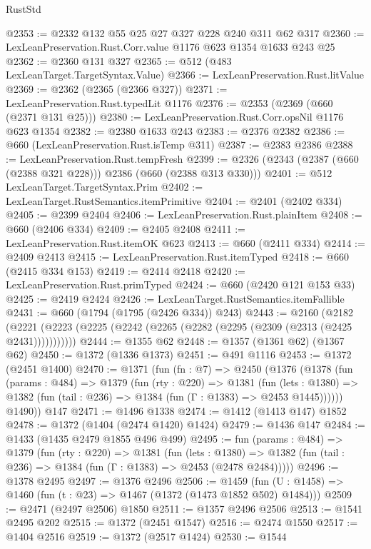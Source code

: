 \begin{lexlean}{RustStd}
\begin{coremodule}
@2353 := @2332 @132 @55 @25 @27 @327 @228 @240 @311 @62 @317
@2360 := LexLeanPreservation.Rust.Corr.value @1176 @623 @1354 @1633 @243 @25
@2362 := @2360 @131 @327
@2365 := @512 (@483 LexLeanTarget.TargetSyntax.Value)
@2366 := LexLeanPreservation.Rust.litValue
@2369 := @2362 (@2365 (@2366 @327))
@2371 := LexLeanPreservation.Rust.typedLit @1176
@2376 := @2353 (@2369 (@660 (@2371 @131 @25)))
@2380 := LexLeanPreservation.Rust.Corr.opsNil @1176 @623 @1354
@2382 := @2380 @1633 @243
@2383 := @2376 @2382
@2386 := @660 (LexLeanPreservation.Rust.isTemp @311)
@2387 := @2383 @2386
@2388 := LexLeanPreservation.Rust.tempFresh
@2399 := @2326 (@2343 (@2387 (@660 (@2388 @321 @228))) @2386 (@660 (@2388 @313 @330)))
@2401 := @512 LexLeanTarget.TargetSyntax.Prim
@2402 := LexLeanTarget.RustSemantics.itemPrimitive
@2404 := @2401 (@2402 @334)
@2405 := @2399 @2404
@2406 := LexLeanPreservation.Rust.plainItem
@2408 := @660 (@2406 @334)
@2409 := @2405 @2408
@2411 := LexLeanPreservation.Rust.itemOK @623
@2413 := @660 (@2411 @334)
@2414 := @2409 @2413
@2415 := LexLeanPreservation.Rust.itemTyped
@2418 := @660 (@2415 @334 @153)
@2419 := @2414 @2418
@2420 := LexLeanPreservation.Rust.primTyped
@2424 := @660 (@2420 @121 @153 @33)
@2425 := @2419 @2424
@2426 := LexLeanTarget.RustSemantics.itemFallible
@2431 := @660 (@1794 (@1795 (@2426 @334)) @243)
@2443 := @2160
    (@2182 (@2221 (@2223 (@2225 (@2242 (@2265 (@2282 (@2295 (@2309 (@2313 (@2425 @2431)))))))))))
@2444 := @1355 @62
@2448 := @1357 (@1361 @62) (@1367 @62)
@2450 := @1372 (@1336 @1373)
@2451 := @491 @1116
@2453 := @1372 (@2451 @1400)
@2470 := @1371
    (fun (fn : @7) =>
    @2450
      (@1376
        (@1378
          (fun (params : @484) =>
          @1379
            (fun (rty : @220) =>
            @1381
              (fun (lets : @1380) =>
              @1382 (fun (tail : @236) => @1384 (fun (Γ : @1383) => @2453 @1445))))))
        @1490))
    @147
@2471 := @1496 @1338
@2474 := @1412 (@1413 @147) @1852
@2478 := @1372 (@1404 (@2474 @1420) @1424)
@2479 := @1436 @147
@2484 := @1433 (@1435 @2479 @1855 @496 @499)
@2495 := fun (params : @484) =>
  @1379
    (fun (rty : @220) =>
    @1381
      (fun (lets : @1380) =>
      @1382 (fun (tail : @236) => @1384 (fun (Γ : @1383) => @2453 (@2478 @2484)))))
@2496 := @1378 @2495
@2497 := @1376 @2496
@2506 := @1459 (fun (U : @1458) => @1460 (fun (t : @23) => @1467 (@1372 (@1473 @1852 @502) @1484)))
@2509 := @2471 (@2497 @2506) @1850
@2511 := @1357 @2496 @2506
@2513 := @1541 @2495 @202
@2515 := @1372 (@2451 @1547)
@2516 := @2474 @1550
@2517 := @1404 @2516
@2519 := @1372 (@2517 @1424)
@2530 := @1544

\end{coremodule}
\end{lexlean}
